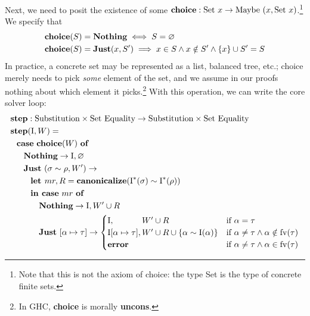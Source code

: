 \documentclass[10pt, letterpaper, oneside]{article}
\newcommand{\inertset}{\text{I}}
\newcommand{\fv}{\mathrm{fv}}
\begin{document}
Next, we need to posit the existence of some \(\text{\bf choice} : \text{Set}~x \to \text{Maybe}~(x, \text{Set}~x)\).\footnote{Note that this is not the axiom of choice: the type Set is the type of concrete finite sets.} We specify that
\begin{align*}
  \text{\bf choice}(S) &= \text{\bf Nothing} \iff S = \varnothing\\
  \text{\bf choice}(S) &= \text{\bf Just}(x, S^\prime) \implies x \in S \land x \notin S^\prime \land \{x\} \cup S^\prime = S
\end{align*}
In practice, a concrete set may be represented as a list, balanced tree, etc.; choice merely needs to pick \emph{some} element of the set, and we assume in our proofs nothing about which element it picks.\footnote{In GHC, \textbf{choice} is morally \textbf{uncons}.} With this operation, we can write the core solver loop:
\begin{align*}
  \text{\bf step} &: \text{Substitution} \times \text{Set}~\text{Equality} \to \text{Substitution} \times \text{Set}~\text{Equality}\\
  \text{\bf step}&(\inertset, W) =\\
      &\!\!\!\!\!\!\!\!\text{\bf case}~\text{\bf choice}(W)~\text{\bf of}\\
      &\!\!\!\text{\bf Nothing} \to \inertset, \varnothing\\
      &\!\!\!\text{\bf Just}~(\sigma \sim \rho, W^\prime) \to\\
      &~\text{\bf let }mr, R = \text{\bf canonicalize}(\inertset^\ast(\sigma) \sim \inertset^\ast(\rho))\\
      &~\text{\bf in }\text{\bf case}~mr~\text{\bf of}\\
      &~~~~\text{\bf Nothing} \to \inertset, W^\prime \cup R\\
      &~~~~\text{\bf Just}~[\alpha \mapsto \tau] \to
        \begin{cases}
          \inertset,\phantom{[\alpha \mapsto \tau]} W^\prime \cup R & \text{if }\alpha = \tau\\
          \inertset[\alpha \mapsto \tau], W^\prime \cup R \cup \{\alpha \sim \inertset(\alpha)\} & \text{if }\alpha \ne \tau \land \alpha \notin \fv(\tau)\\
          \text{\bf error} & \text{if }\alpha \ne \tau \land \alpha \in \fv(\tau)
        \end{cases}
\end{align*}
\end{document}
